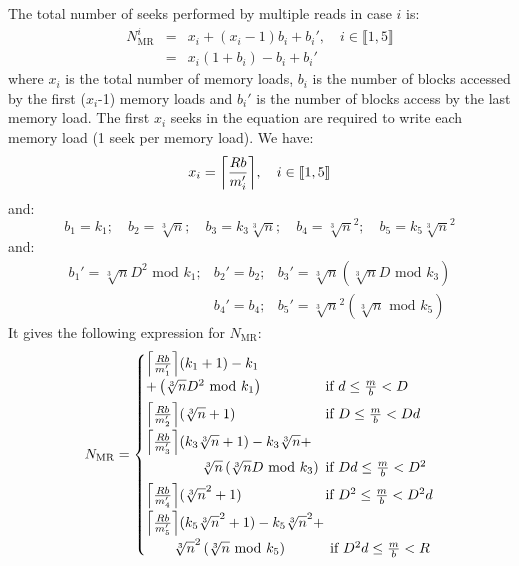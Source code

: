 \documentclass[10pt, conference, compsocconf]{IEEEtran}
\DeclarePairedDelimiter{\ceil}{\lceil}{\rceil}
\begin{document}
The total number of seeks performed by multiple reads in case $i$ is:
\begin{eqnarray*}
  N^i_{\mathrm{MR}} &=& x_i + (x_i-1)b_i +b_i', \quad i \in \llbracket 1,5 \rrbracket\\
  &=& x_i \left(1+b_i\right)-b_i+b_i'
\end{eqnarray*}
where $x_i$ is the total number of memory loads, $b_i$ is the
number of blocks accessed by the first ($x_i$-1) memory loads and
$b_i'$ is the number of blocks access by the last memory load. The
first $x_i$ seeks in the equation are required to write each memory
load (1 seek per memory load). We have:
\begin{equation*}
  x_i = \ceil*{\frac{Rb}{m_i'}}, \quad i \in \llbracket 1,5 \rrbracket
\end{equation*}
and:
\begin{equation*}
b_1=k_1 ; \quad b_2=\sqrt[3]{n} ; \quad b_3 = k_3\sqrt[3]{n} ; \quad b_4=\sqrt[3]{n}^2 ; \quad b_5=k_5\sqrt[3]{n}^2
\end{equation*}
and:
\begin{eqnarray*}
b_1'=\sqrt[3]{n}D^2\text{ mod }k_1; &b_2'=b_2;   & b_3' = \sqrt[3]{n}\left( \sqrt[3]{n}D\text{ mod }k_3\right)\\
                                   &b_4'=b_4;  & b_5'=\sqrt[3]{n}^2\left( \sqrt[3]{n}\text{ mod }k_5\right) 
\end{eqnarray*}
It gives the following expression for $N_\mathrm{MR}$:
\begin{equation*}
  N_\mathrm{MR} =
\begin{cases}
  \ceil*{\frac{Rb}{m_1'}}(k_1+1)-k_1 \\
  + \left( \sqrt[3]{n}D^2 \text{ mod } k_1 \right)& \text{\hspace*{-0.9em}if } d \leq \frac{m}{b} < D\\[0.4em]
  
  \ceil*{\frac{Rb}{m_2'}}(\sqrt[3]{n}+1)   & \text{\hspace*{-0.9em}if } D \leq \frac{m}{b} < Dd\\[0.4em]
  
  \ceil*{\frac{Rb}{m_3'}}(k_3\sqrt[3]{n}+1)-k_3\sqrt[3]{n}+\\[0.4em]
  \quad \quad \quad \quad \sqrt[3]{n}\left(\sqrt[3]{n}D\text{ mod } k_3\right)& \text{\hspace*{-0.9em}if } Dd \leq \frac{m}{b} < D^2\\[0.4em]
  \ceil*{\frac{Rb}{m_4'}}(\sqrt[3]{n}^2+1) & \text{\hspace*{-0.9em}if } D^2 \leq \frac{m}{b} < D^2d\\[0.4em]
  \ceil*{\frac{Rb}{m_5'}}(k_5\sqrt[3]{n}^2+1)-k_5\sqrt[3]{n}^2+&\\[0.4em]
  \quad \quad \sqrt[3]{n}^2\left(\sqrt[3]{n} \text{ mod } k_5\right)&\
  \text{\hspace*{-0.9em}if } D^2d \leq \frac{m}{b} < R
\end{cases}
\end{equation*}
\end{document}
